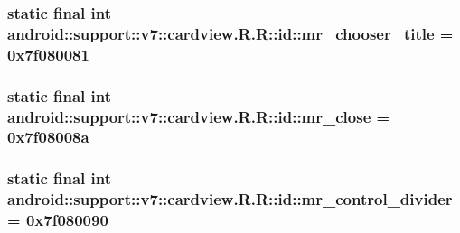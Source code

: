 \hypertarget{classandroid_1_1support_1_1v7_1_1cardview_1_1_r_1_1id_039dd193d9e1ad4604d0ac711904e74e}{
\subsubsection[{mr\_\-chooser\_\-title}]{\setlength{\rightskip}{0pt plus 5cm}static final int android::support::v7::cardview.R.R::id::mr\_\-chooser\_\-title = 0x7f080081}}
\label{classandroid_1_1support_1_1v7_1_1cardview_1_1_r_1_1id_039dd193d9e1ad4604d0ac711904e74e}


\hypertarget{classandroid_1_1support_1_1v7_1_1cardview_1_1_r_1_1id_9f2cb1d822c3e0b0df664ef1e67e47fe}{
\subsubsection[{mr\_\-close}]{\setlength{\rightskip}{0pt plus 5cm}static final int android::support::v7::cardview.R.R::id::mr\_\-close = 0x7f08008a}}
\label{classandroid_1_1support_1_1v7_1_1cardview_1_1_r_1_1id_9f2cb1d822c3e0b0df664ef1e67e47fe}


\hypertarget{classandroid_1_1support_1_1v7_1_1cardview_1_1_r_1_1id_8e739b22d4c8942669b6697511005595}{
\subsubsection[{mr\_\-control\_\-divider}]{\setlength{\rightskip}{0pt plus 5cm}static final int android::support::v7::cardview.R.R::id::mr\_\-control\_\-divider = 0x7f080090}}
\label{classandroid_1_1support_1_1v7_1_1cardview_1_1_r_1_1id_8e739b22d4c8942669b6697511005595}


